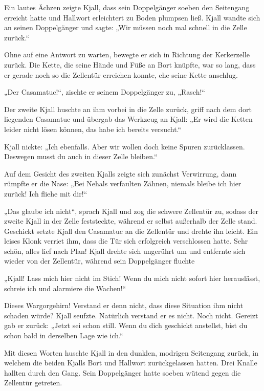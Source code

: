Ein lautes Ächzen zeigte Kjall, dass sein Doppelgänger soeben den Seitengang erreicht hatte und Hallwort erleichtert zu Boden plumpsen ließ. Kjall wandte sich an seinen Doppelgänger und sagte: „Wir müssen noch mal schnell in die Zelle zurück.“

Ohne auf eine Antwort zu warten, bewegte er sich in Richtung der Kerkerzelle zurück. Die Kette, die seine Hände und Füße an Bort knüpfte, war so lang, dass er gerade noch so die Zellentür erreichen konnte, ehe seine Kette anschlug.

„Der Casamatuc!“, zischte er seinem Doppelgänger zu, „Rasch!“

Der zweite Kjall huschte an ihm vorbei in die Zelle zurück, griff nach dem dort liegenden Casamatuc und übergab das Werkzeug an Kjall: „Er wird die Ketten leider nicht lösen können, das habe ich bereits versucht.“

Kjall nickte: „Ich ebenfalls. Aber wir wollen doch keine Spuren zurücklassen. Deswegen musst du auch in dieser Zelle bleiben.“

Auf dem Gesicht des zweiten Kjalls zeigte sich zunächst Verwirrung, dann rümpfte er die Nase: „Bei Nehals verfaulten Zähnen, niemals bleibe ich hier zurück! Ich fliehe mit dir!“

„Das glaube ich nicht“, sprach Kjall und zog die schwere Zellentür zu, sodass der zweite Kjall in der Zelle feststeckte, während er selbst außerhalb der Zelle stand. Geschickt setzte Kjall den Casamatuc an die Zellentür und drehte ihn leicht. Ein leises Klonk verriet ihm, dass die Tür sich erfolgreich verschlossen hatte. Sehr schön, alles lief nach Plan! Kjall drehte sich ungerührt um und entfernte sich wieder von der Zellentür, während sein Doppelgänger fluchte

„Kjall! Lass mich hier nicht im Stich! Wenn du mich nicht sofort hier herauslässt, schreie ich und alarmiere die Wachen!“

Dieses Wargorgehirn! Verstand er denn nicht, dass diese Situation ihm nicht schaden würde? Kjall seufzte. Natürlich verstand er es nicht. Noch nicht. Gereizt gab er zurück: „Jetzt sei schon still. Wenn du dich geschickt anstellst, bist du schon bald in derselben Lage wie ich.“

Mit diesen Worten huschte Kjall in den dunklen, modrigen Seitengang zurück, in welchem die beiden Kjalls Bort und Hallwort zurückgelassen hatten. Drei Knalle hallten durch den Gang. Sein Doppelgänger hatte soeben wütend gegen die Zellentür getreten.\bigskip



